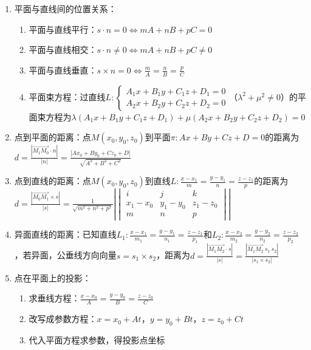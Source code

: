\documentclass[UTF8]{ctexart}
\theoremstyle{remark}
\begin{document}
\begin{enumerate}
\item 平面与直线间的位置关系：
\begin{enumerate}
	\item 平面与直线平行：\(s \cdot n = 0 \Leftrightarrow mA + nB + pC = 0\)
	\item 平面与直线相交：\(s \cdot n \neq 0 \Leftrightarrow mA + nB + pC \neq 0\)
	\item 平面与直线垂直：\(s \times n = 0 \Leftrightarrow \frac{m}{A} = \frac{n}{B} = \frac{p}{C}\)
	\item 平面束方程：过直线\(L: \begin{cases} A_1x + B_1y + C_1z + D_1 = 0 \\ A_2x + B_2y + C_2z + D_2 = 0 \end{cases}\)（\(\lambda^2 + \mu^2 \neq 0\)）的平面束方程为\(\lambda(A_1x + B_1y + C_1z + D_1) + \mu(A_2x + B_2y + C_2z + D_2) = 0\)
\end{enumerate}

\item 点到平面的距离：点\(M(x_0, y_0, z_0)\)到平面\(\pi: Ax + By + Cz + D = 0\)的距离为\(d = \frac{|\overrightarrow{M_1M_0} \cdot n|}{|n|} = \frac{|Ax_0 + By_0 + Cz_0 + D|}{\sqrt{A^2 + B^2 + C^2}}\)

\item 点到直线的距离：点\(M(x_0, y_0, z_0)\)到直线\(L: \frac{x - x_1}{m} = \frac{y - y_1}{n} = \frac{z - z_1}{p}\)的距离为\(d = \frac{|\overrightarrow{M_0M_1} \times s|}{|s|} = \frac{1}{\sqrt{m^2 + n^2 + p^2}} \left| \begin{vmatrix} i & j & k \\ x_1 - x_0 & y_1 - y_0 & z_1 - z_0 \\ m & n & p \end{vmatrix} \right|\)

\item 异面直线的距离：已知直线\(L_1: \frac{x - x_1}{m_1} = \frac{y - y_1}{n_1} = \frac{z - z_1}{p_1}\)和\(L_2: \frac{x - x_2}{m_2} = \frac{y - y_2}{n_2} = \frac{z - z_2}{p_2}\)，若异面，公垂线方向向量\(s = s_1 \times s_2\)，距离为\(d = \frac{|\overrightarrow{M_1M_2} \cdot s|}{|s|} = \frac{|\overrightarrow{M_1M_2}\ s_1\ s_2|}{|s_1 \times s_2|}\)

\item 点在平面上的投影：
\begin{enumerate}
	\item 求垂线方程：\(\frac{x - x_0}{A} = \frac{y - y_0}{B} = \frac{z - z_0}{C}\)
	\item 改写成参数方程：\(x = x_0 + At\)，\(y = y_0 + Bt\)，\(z = z_0 + Ct\)
	\item 代入平面方程求参数，得投影点坐标
\end{enumerate}


\end{enumerate}
\end{document}
